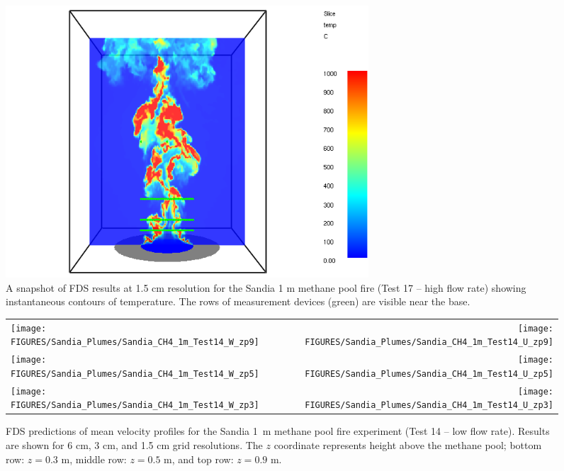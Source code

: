\begin{figure}[h]
\begin{center}
\includegraphics[height=4in]{FIGURES/Sandia_Plumes/Sandia_CH4_1m_image}
\caption[Sandia 1~m methane pool fire instantaneous temperature contours.]{A snapshot of FDS results at 1.5 cm resolution for the Sandia 1 m methane pool fire (Test 17 -- high flow rate) showing instantaneous contours of temperature.  The rows of measurement devices (green) are visible near the base.}
\label{Sandia_CH4_1m_image}
\end{center}
\end{figure}

\newpage

\begin{figure}[p]
\begin{tabular*}{\textwidth}{l@{\extracolsep{\fill}}r}
\texttt{[image: FIGURES/Sandia\_Plumes/Sandia\_CH4\_1m\_Test14\_W\_zp9]} &
\texttt{[image: FIGURES/Sandia\_Plumes/Sandia\_CH4\_1m\_Test14\_U\_zp9]} \\
\texttt{[image: FIGURES/Sandia\_Plumes/Sandia\_CH4\_1m\_Test14\_W\_zp5]} &
\texttt{[image: FIGURES/Sandia\_Plumes/Sandia\_CH4\_1m\_Test14\_U\_zp5]} \\
\texttt{[image: FIGURES/Sandia\_Plumes/Sandia\_CH4\_1m\_Test14\_W\_zp3]} &
\texttt{[image: FIGURES/Sandia\_Plumes/Sandia\_CH4\_1m\_Test14\_U\_zp3]}
\end{tabular*}
\caption[Sandia 1~m methane pool fire (Test 14) mean velocity profiles]
{FDS predictions of mean velocity profiles for the Sandia 1~m methane pool fire experiment (Test 14 -- low flow rate). Results are shown for 6 cm, 3 cm, and 1.5 cm grid resolutions. The $z$ coordinate represents height above the methane pool; bottom row: $z=0.3$ m, middle row: $z=0.5$ m, and top row: $z=0.9$ m.}
\label{Sandia_CH4_1m_Test14_velocity}
\end{figure}

